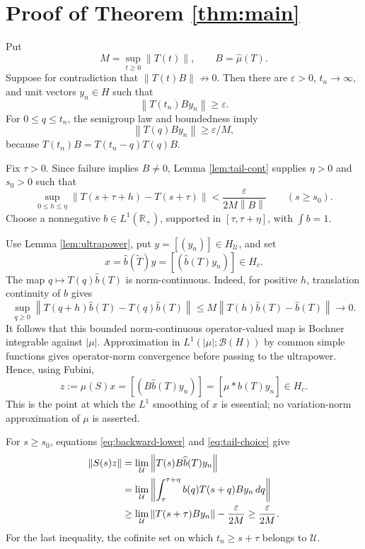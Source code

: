 \documentclass[11pt]{article}
\newcommand{\R}{\mathbb R}
\newcommand{\B}{\mathcal B}
\newcommand{\norm}[1]{\left\lVert#1\right\rVert}
\begin{document}
\section{Proof of Theorem \ref{thm:main}}

Put
\[
 M=\sup_{t\ge0}\norm{T(t)},
 \qquad B=\widehat\mu(T).
\]
Suppose for contradiction that \(\norm{T(t)B}\not\to0\). Then there are
\(\varepsilon>0\), \(t_n\to\infty\), and unit vectors \(y_n\in H\) such
that
\begin{equation}\label{eq:failure}
 \norm{T(t_n)By_n}\ge\varepsilon.
\end{equation}
For \(0\le q\le t_n\), the semigroup law and boundedness imply
\begin{equation}\label{eq:backward-lower}
 \norm{T(q)By_n}\ge\varepsilon/M,
\end{equation}
because \(T(t_n)B=T(t_n-q)T(q)B\).

Fix \(\tau>0\). Since failure implies \(B\ne0\), Lemma
\ref{lem:tail-cont} supplies \(\eta>0\) and \(s_0>0\) such that
\begin{equation}\label{eq:tail-choice}
 \sup_{0\le h\le\eta}
 \norm{T(s+\tau+h)-T(s+\tau)}
 <\frac{\varepsilon}{2M\norm B}
 \qquad(s\ge s_0).
\end{equation}
Choose a nonnegative \(b\in L^1(\R_+)\), supported in
\([\tau,\tau+\eta]\), with \(\int b=1\).

Use Lemma \ref{lem:ultrapower}, put \(y=[(y_n)]\in H_{\mathcal U}\), and set
\[
 x=\widehat b(\widetilde T)y
   =[(\widehat b(T)y_n)]\in H_c.
\]
The map \(q\mapsto T(q)\widehat b(T)\) is norm-continuous. Indeed, for
positive \(h\), translation continuity of \(b\) gives
\[
 \sup_{q\ge0}\norm{T(q+h)\widehat b(T)-T(q)\widehat b(T)}
 \le M\norm{T(h)\widehat b(T)-\widehat b(T)}\longrightarrow0.
\]
It follows that this bounded norm-continuous operator-valued map is Bochner
integrable against \(|\mu|\). Approximation in
\(L^1(|\mu|;\B(H))\) by common simple functions gives operator-norm
convergence before passing to the ultrapower. Hence, using Fubini,
\begin{equation}\label{eq:measure-passes}
 z:=\widehat\mu(S)x
 =[(B\widehat b(T)y_n)]
 =[\widehat{\mu*b}(T)y_n]\in H_c.
\end{equation}
This is the point at which the \(L^1\) smoothing of \(x\) is essential; no
variation-norm approximation of \(\mu\) is asserted.

For \(s\ge s_0\), equations \eqref{eq:backward-lower} and
\eqref{eq:tail-choice} give
\begin{align}
 \norm{S(s)z}
 &=\lim_{\mathcal U}
   \norm{T(s)B\widehat b(T)y_n}\notag\\
 &=\lim_{\mathcal U}
   \norm{\int_{\tau}^{\tau+\eta}b(q)T(s+q)By_n\,dq}\notag\\
 &\ge\lim_{\mathcal U}\norm{T(s+\tau)By_n}
      -\frac{\varepsilon}{2M}
 \ge\frac{\varepsilon}{2M}.\label{eq:nondecay}
\end{align}
For the last inequality, the cofinite set on which \(t_n\ge s+\tau\)
belongs to \(\mathcal U\).
\end{document}
